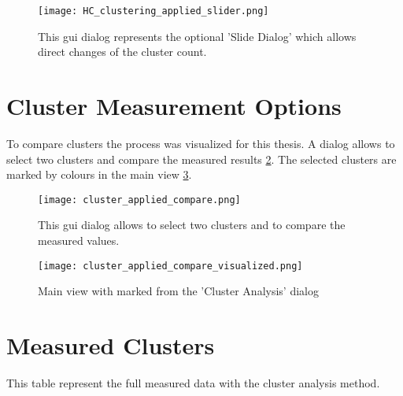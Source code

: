 \begin{figure}[ht]
    \centering
    \texttt{[image: HC\_clustering\_applied\_slider.png]}
    \caption{This gui dialog represents the optional 'Slide Dialog' which allows direct changes of the cluster count.}
    \label{fig:applied_HC_clustering_slider_GUI}
\end{figure}

\pagebreak
\section{Cluster Measurement Options} \label{sec:cluster_measurement_options}
To compare clusters the process was visualized for this thesis. A dialog allows to select two clusters and compare the measured results \ref{fig:applied_clustering_analysis_GUI}. The selected clusters are marked by colours in the main view \ref{fig:applied_clustering_analysis_visualized_GUI}.

\begin{figure}[ht]
    \centering
    \texttt{[image: cluster\_applied\_compare.png]}
    \caption{This gui dialog allows to select two clusters and to compare the measured values.}
    \label{fig:applied_clustering_analysis_GUI}
\end{figure}

\begin{figure}[ht]
    \centering
    \begin{mdframed}[style=border]
        \texttt{[image: cluster\_applied\_compare\_visualized.png]}
    \end{mdframed}
    \caption{Main view with marked from the 'Cluster Analysis' dialog}
    \label{fig:applied_clustering_analysis_visualized_GUI}
\end{figure}

\FloatBarrier
\section{Measured Clusters} \label{sec:measurements_full_table}
This table represent the full measured data with the cluster analysis method.

